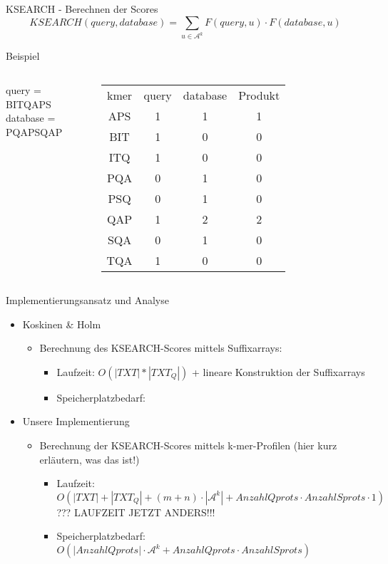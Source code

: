 \documentclass[aspectratio=1610]{beamer}
\begin{document}
\begin{frame}{KSEARCH - Berechnen der Scores}
  \begin{equation*}
    KSEARCH(query,database) = \sum_{u \in \mathcal A^k} F(query,u) \cdot F(database,u)
  \end{equation*}  
  \begin{block}{Beispiel}
    \begin{columns}
    query = BITQAPS\\
    database = PQAPSQAP\\  
    \scriptsize\begin{tabular}{cccc}
    kmer & query & database & Produkt\\
    APS & 1 & 1 & 1\\
    BIT & 1 & 0 & 0\\
    ITQ & 1 & 0 & 0 \\
    PQA & 0 & 1 & 0\\
    PSQ & 0 & 1 & 0\\
    QAP & 1 & 2 & 2\\
    SQA & 0 & 1 & 0\\
    TQA & 1 & 0 & 0\\    
    \end{tabular}
    \normalsize
    \end{columns}
  \end{block}
\end{frame}

\begin{frame}{Implementierungsansatz und Analyse}
  \begin{itemize}
    \item Koskinen \& Holm
      \begin{itemize}
        \item Berechnung des KSEARCH-Scores mittels Suffixarrays:
          \begin{itemize}
            \item Laufzeit: $O(|TXT|*|TXT_Q|)$ + lineare Konstruktion der Suffixarrays
            \item Speicherplatzbedarf:
          \end{itemize}
      \end{itemize}
    \item Unsere Implementierung
      \begin{itemize}
        \item Berechnung der KSEARCH-Scores mittels k-mer-Profilen (hier kurz erläutern, was das ist!)
          \begin{itemize}
            \item Laufzeit: $O(|TXT|+|TXT_Q|+(m+n) \cdot |\mathcal A^k|+ Anzahl Qprots \cdot Anzahl Sprots \cdot 1)$ ??? LAUFZEIT JETZT ANDERS!!!
            \item Speicherplatzbedarf: $O(|Anzahl Qprots| \cdot \mathcal A^k + Anzahl Qprots \cdot Anzahl Sprots)$
          \end{itemize}
      \end{itemize}
  \end{itemize}
\end{frame}
\end{document}
